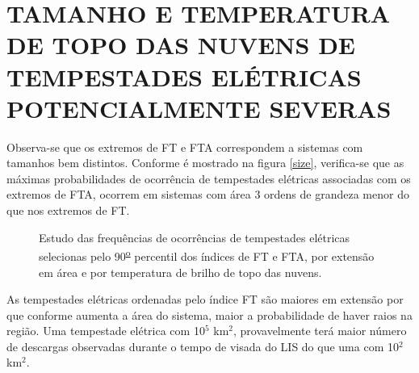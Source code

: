 


\section{TAMANHO E TEMPERATURA DE TOPO DAS NUVENS DE TEMPESTADES ELÉTRICAS POTENCIALMENTE SEVERAS}

Observa-se que os extremos de FT e FTA correspondem a sistemas com tamanhos bem distintos. Conforme é mostrado na figura \ref{size}, verifica-se que as máximas probabilidades de ocorrência de tempestades elétricas associadas com os extremos de FTA, ocorrem em sistemas com área 3 ordens de grandeza menor do que nos extremos de FT.



\begin{figure}[!hb]
  \label{t_tb}
  \caption{Estudo das frequências de ocorrências de tempestades elétricas selecionas pelo 90\textsuperscript{\underline{o}} percentil dos índices de FT e FTA, por extensão em área e por temperatura de brilho de topo das nuvens.}
\end{figure}


As tempestades elétricas ordenadas pelo índice FT são maiores em extensão por que conforme aumenta a área do sistema, maior a probabilidade de haver raios na região. Uma tempestade elétrica com 10$^5$ km$^2$, provavelmente terá maior número de descargas observadas durante o tempo de visada do LIS do que uma com 10$^2$ km$^2$. 


